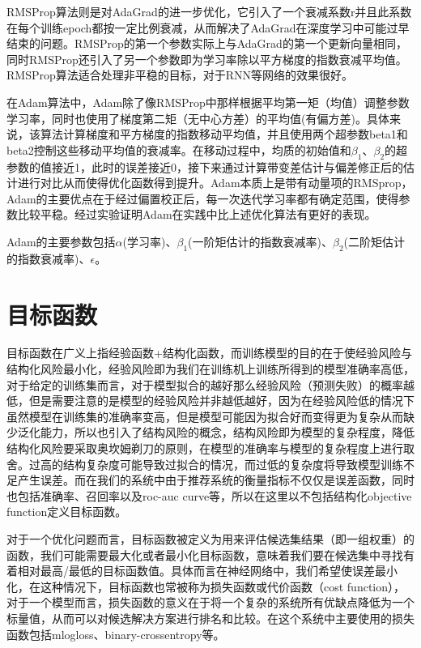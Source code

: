 RMSProp算法则是对AdaGrad的进一步优化，它引入了一个衰减系数r并且此系数在每个训练epoch都按一定比例衰减，从而解决了AdaGrad在深度学习中可能过早结束的问题。RMSProp的第一个参数实际上与AdaGrad的第一个更新向量相同，同时RMSProp还引入了另一个参数即为学习率除以平方梯度的指数衰减平均值。RMSProp算法适合处理非平稳的目标，对于RNN等网络的效果很好。

在Adam算法中，Adam除了像RMSProp中那样根据平均第一矩（均值）调整参数学习率，同时也使用了梯度第二矩（无中心方差）的平均值(有偏方差)。具体来说，该算法计算梯度和平方梯度的指数移动平均值，并且使用两个超参数beta1和beta2控制这些移动平均值的衰减率。在移动过程中，均质的初始值和${\beta}_{1}$、${\beta}_{2}$的超参数的值接近1，此时的误差接近0，接下来通过计算带变差估计与偏差修正后的估计进行对比从而使得优化函数得到提升。Adam本质上是带有动量项的RMSprop，Adam的主要优点在于经过偏置校正后，每一次迭代学习率都有确定范围，使得参数比较平稳。经过实验证明Adam在实践中比上述优化算法有更好的表现。

Adam的主要参数包括${\alpha}$(学习率)、${\beta}_{1}$(一阶矩估计的指数衰减率)、${\beta}_{2}$(二阶矩估计的指数衰减率)、${\epsilon}$。



\section{目标函数}

目标函数在广义上指经验函数+结构化函数，而训练模型的目的在于使经验风险与结构化风险最小化，经验风险即为我们在训练机上训练所得到的模型准确率高低，对于给定的训练集而言，对于模型拟合的越好那么经验风险（预测失败）的概率越低，但是需要注意的是模型的经验风险并非越低越好，因为在经验风险低的情况下虽然模型在训练集的准确率变高，但是模型可能因为拟合好而变得更为复杂从而缺少泛化能力，所以也引入了结构风险的概念，结构风险即为模型的复杂程度，降低结构化风险要采取奥坎姆剃刀的原则，在模型的准确率与模型的复杂程度上进行取舍。过高的结构复杂度可能导致过拟合的情况，而过低的复杂度将导致模型训练不足产生误差。而在我们的系统中由于推荐系统的衡量指标不仅仅是误差函数，同时也包括准确率、召回率以及roc-auc curve等，所以在这里以不包括结构化objective function定义目标函数。

对于一个优化问题而言，目标函数被定义为用来评估候选集结果（即一组权重）的函数，我们可能需要最大化或者最小化目标函数，意味着我们要在候选集中寻找有着相对最高/最低的目标函数值。具体而言在神经网络中，我们希望使误差最小化，在这种情况下，目标函数也常被称为损失函数或代价函数（cost function），对于一个模型而言，损失函数的意义在于将一个复杂的系统所有优缺点降低为一个标量值，从而可以对候选解决方案进行排名和比较\cite{NeuralSmithing}。在这个系统中主要使用的损失函数包括mlogloss、binary-crossentropy等。


